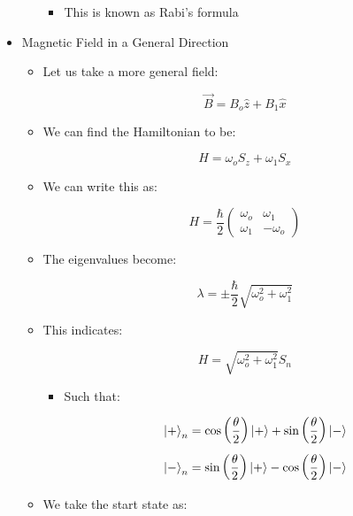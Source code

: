 \begin{itemize}
\begin{itemize}
        \begin{itemize}

          \item This is known as Rabi's formula

        \end{itemize}

    \end{itemize}

  \item Magnetic Field in a General Direction

    \begin{itemize}

      \item Let us take a more general field:

        $$\vec{B}=B_o\hat{z}+B_1\hat{x}$$

      \item We can find the Hamiltonian to be:

        $$H=\omega_oS_z+\omega_1S_x$$

      \item We can write this as:

        $$H=\frac{\hbar}{2}\left( \begin{matrix} \omega_o & \omega_1\\ \omega_1 & -\omega_o\end{matrix} \right)$$

      \item The eigenvalues become:

        $$\lambda=\pm\frac{\hbar}{2}\sqrt{\omega_o^2+\omega_1^2}$$

      \item This indicates:

        $$H=\sqrt{\omega_o^2+\omega_1^2}S_n$$

        \begin{itemize}

          \item Such that:

            $$\ket{+}_n=\cos\left( \frac{\theta}{2} \right)\ket{+}+\sin\left( \frac{\theta}{2} \right)\ket{-}$$
            $$\ket{-}_n=\sin\left( \frac{\theta}{2} \right)\ket{+}-\cos\left( \frac{\theta}{2} \right)\ket{-}$$

        \end{itemize}

      \item We take the start state as:
        

\end{itemize}
\end{itemize}
